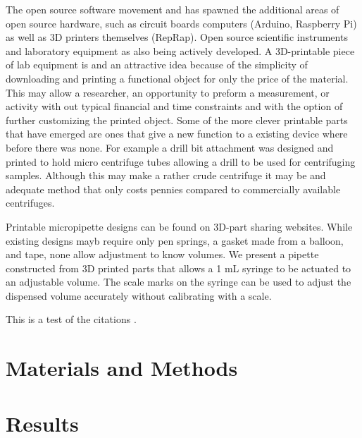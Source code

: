The open source software movement and has spawned the additional areas of open source hardware, such as circuit boards computers (Arduino, Raspberry Pi) as well as 3D printers themselves (RepRap).
Open source scientific instruments and laboratory equipment as also being actively developed.
A 3D-printable piece of lab equipment is and an attractive idea because of the simplicity of downloading and printing a functional object for only the price of the material. 
This may allow a researcher, an opportunity to preform a measurement, or activity with out typical financial and time constraints and with the option of further customizing the printed object.
Some of the more clever printable parts that have emerged  are ones that give a new function to a existing device where before there was none.
For example a drill bit attachment was designed and printed to hold micro centrifuge tubes allowing a drill to be used for centrifuging samples. 
Although this may make a rather crude centrifuge it may be and adequate method that only costs pennies compared to commercially available centrifuges.

Printable micropipette designs can be found on 3D-part sharing websites.
While existing designs mayb require only pen springs, a gasket made from a balloon, and tape, none allow adjustment to know volumes.
We present a pipette constructed from 3D printed parts that allows a 1 mL syringe to be actuated to an adjustable volume.
The scale marks on the syringe can be used to adjust the dispensed volume accurately without calibrating with a scale.



This is a test of the citations \cite{oppegard2010}.


\section*{Materials and Methods}

\section*{Results}

